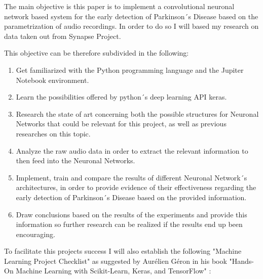 \documentclass[12pt, a4paper]{article}
\begin{document}
	The main objective is this paper is to implement a convolutional neuronal network based system for the early detection of Parkinson´s Disease based on the parametrization of audio recordings. In order to do so I will based my research on data taken out from Synapse Project. \cite{synapse}
	
	This objective can be therefore subdivided in the following:
	
	\begin{enumerate}

		\item Get familiarized with the Python programming language and the Jupiter Notebook environment.
		
		\item Learn the possibilities offered by python´s deep learning API keras.
		
		\item Research the state of art concerning both the possible structures for Neuronal Networks that could be relevant for this project, as well as previous researches on this topic.
		
		\item Analyze the raw audio data in order to extract the relevant information to then feed into the Neuronal Networks.
		
		\item Implement, train and compare the results of different Neuronal Network´s architectures, in order to provide evidence of their effectiveness regarding the early detection of Parkinson´s Disease based on the provided information.
		
		\item Draw conclusions based on the results of the experiments and provide this information so further research can be realized if the results end up been encouraging.
		
	\end{enumerate}

	To facilitate this projects success I will also establish the following "Machine Learning Project Checklist" as suggested by Aurélien Géron in his book "Hands-On Machine Learning with Scikit-Learn, Keras, and TensorFlow" \cite{handsonmachinelearning}:
	
\end{document}
